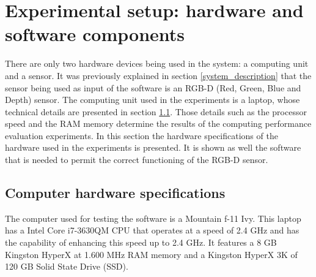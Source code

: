 \section{Experimental setup: hardware and software components}
There are only two hardware devices being used in the system: a computing unit and a sensor. 
It was previously explained in section \ref{system_description} that the sensor being used as input of the software is an RGB-D (Red, Green, Blue and Depth) sensor. 
The computing unit used in the experiments is a laptop, whose technical details are presented in section \ref{computer}. 
Those details such as the processor speed and the RAM memory determine the results of the computing performance evaluation experiments. 
In this section the hardware specifications of the hardware used in the experiments is presented. 
It is shown as well the software that is needed to permit the correct functioning of the RGB-D sensor.



\subsection{Computer hardware specifications}
\label{computer}
	The computer used for testing the software is a Mountain f-11 Ivy. %
	This laptop has a Intel Core i7-3630QM  CPU that operates at a speed of 2.4 GHz and has the capability of enhancing this speed up to 2.4 GHz. 
	It features a 8 GB Kingston HyperX at 1.600 MHz RAM memory and a  Kingston HyperX 3K of 120 GB Solid State Drive (SSD).




